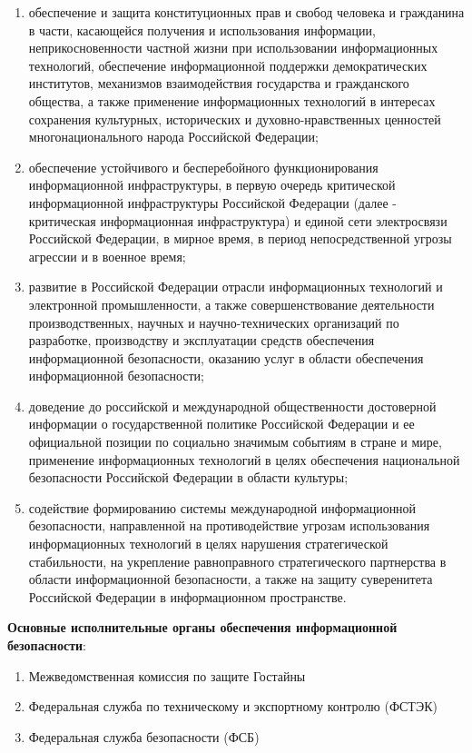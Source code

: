 \documentclass{article}
\begin{document}
\begin{enumerate}
    \item обеспечение и защита конституционных прав и свобод человека и гражданина в части, касающейся получения и использования информации, неприкосновенности частной жизни при использовании информационных технологий, обеспечение информационной поддержки демократических институтов, механизмов взаимодействия государства и гражданского общества, а также применение информационных технологий в интересах сохранения культурных, исторических и духовно-нравственных ценностей многонационального народа Российской Федерации;
    \item обеспечение устойчивого и бесперебойного функционирования информационной инфраструктуры, в первую очередь критической информационной инфраструктуры Российской Федерации (далее - критическая информационная инфраструктура) и единой сети электросвязи Российской Федерации, в мирное время, в период непосредственной угрозы агрессии и в военное время;
    \item развитие в Российской Федерации отрасли информационных технологий и электронной промышленности, а также совершенствование деятельности производственных, научных и научно-технических организаций по разработке, производству и эксплуатации средств обеспечения информационной безопасности, оказанию услуг в области обеспечения информационной безопасности;
    \item доведение до российской и международной общественности достоверной информации о государственной политике Российской Федерации и ее официальной позиции по социально значимым событиям в стране и мире, применение информационных технологий в целях обеспечения национальной безопасности Российской Федерации в области культуры;
    \item содействие формированию системы международной информационной безопасности, направленной на противодействие угрозам использования информационных технологий в целях нарушения стратегической стабильности, на укрепление равноправного стратегического партнерства в области информационной безопасности, а также на защиту суверенитета Российской Федерации в информационном пространстве.
\end{enumerate}

\textbf{Основные исполнительные органы обеспечения информационной безопасности}:

\begin{enumerate}
    \item Межведомственная комиссия по защите Гостайны
    \item Федеральная служба по техническому и экспортному контролю (ФСТЭК)
    \item Федеральная служба безопасности (ФСБ)
\end{enumerate}
\end{document}
